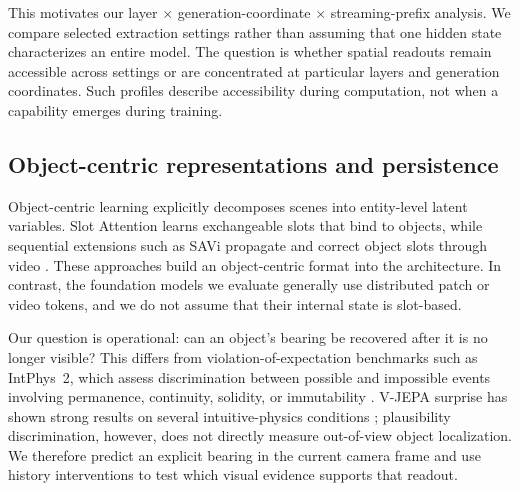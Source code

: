 \documentclass{article} %
\begin{document}
This motivates our layer $\times$ generation-coordinate $\times$
streaming-prefix analysis. We compare selected extraction settings rather
than assuming that one hidden state characterizes an entire model. The
question is whether spatial readouts remain accessible across settings or
are concentrated at particular layers and generation coordinates. Such
profiles describe accessibility during computation, not when a capability
emerges during training.

\subsection{Object-centric representations and persistence}
\label{sec:rw-object-centric}

Object-centric learning explicitly decomposes scenes into entity-level latent
variables. Slot Attention learns exchangeable slots that bind to objects, while
sequential extensions such as SAVi propagate and correct object slots through
video \citep{locatello2020slotattention,kipf2022savi}. These approaches build an
object-centric format into the architecture. In contrast, the foundation models
we evaluate generally use distributed patch or video tokens, and we do not
assume that their internal state is slot-based.

Our question is operational: can an object's bearing be recovered after
it is no longer visible? This differs from violation-of-expectation
benchmarks such as IntPhys~2, which assess discrimination between possible
and impossible events involving permanence, continuity, solidity, or
immutability \citep{bordes2025intphys2}. V-JEPA surprise has shown strong
results on several intuitive-physics conditions
\citep{garrido2025intuitivephysics}; plausibility discrimination, however,
does not directly measure out-of-view object localization. We therefore predict
an explicit bearing in the current camera frame and use history interventions
to test which visual evidence supports that readout.
\end{document}

